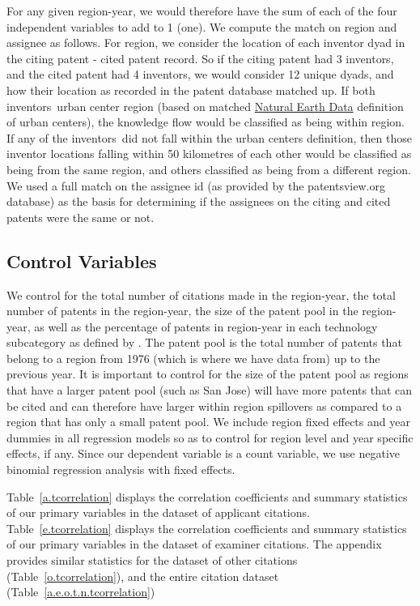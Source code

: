 \documentclass[12pt,letterpaper]{article}
\begin{document}
For any given region-year, we would therefore have the sum of each of the four independent variables to add to 1 (one). We compute the match on region and assignee as follows. For region, we consider the location of each inventor dyad in the citing patent - cited patent record. So if the citing patent had 3 inventors, and the cited patent had 4 inventors, we would consider 12 unique dyads, and how their location as recorded in the patent database matched up. If both inventors\textquotesingle \ urban center region (based on  matched \href{http://www.naturalearthdata.com/downloads/10m-cultural-vectors/}{Natural Earth Data} definition of urban centers), the knowledge flow would be classified as being within region. If any of the inventors\textquotesingle \ did not fall within the urban centers definition, then those inventor locations falling within 50 kilometres of each other would be classified as being from the same region, and others classified as being from a different region. We used a full match on the assignee id (as provided by the patentsview.org database) as the basis for determining if the assignees on the citing and cited patents were the same or not.

\subsection{Control Variables}
We control for the total number of citations made in the region-year, the total number of patents in the region-year, the size of the patent pool in the region-year, as well as the percentage of patents in region-year in each technology subcategory as defined by \cite*{Hall2001a}. The patent pool is the total number of patents that belong to a region from 1976 (which is where we have data from) up to the previous year. It is important to control for the size of the patent pool as  regions that have a larger patent pool (such as San Jose) will have more patents that can be cited and can therefore have larger within region spillovers as compared to a region that has only a small patent pool. We include region fixed effects and year dummies in all regression models so as to control for region level and year specific effects, if any. Since our dependent variable is a count variable, we use negative binomial regression analysis with fixed effects. \par

Table~\ref{a.tcorrelation} displays the correlation coefficients and summary statistics of our primary variables in the dataset of applicant  citations. Table~\ref{e.tcorrelation} displays the correlation coefficients and summary statistics of our primary variables in the dataset of examiner  citations. The appendix provides similar statistics for the dataset of other citations (Table~\ref{o.tcorrelation}), and the entire citation dataset (Table~\ref{a.e.o.t.n.tcorrelation})
\end{document}
